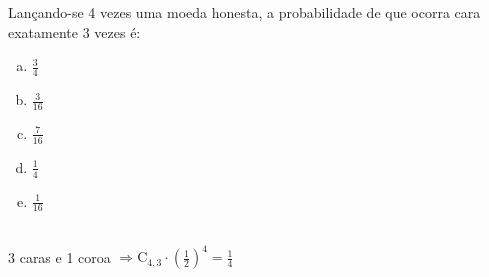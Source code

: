 \begin{ex}
Lançando-se 4 vezes uma moeda honesta, a probabilidade de que ocorra cara exatamente 3 vezes é:
   \begin{enumerate}[(a)]
   \item $\frac{3}{4}$
   \item $\frac{3}{16}$
   \item $\frac{7}{16}$
   \item $\frac{1}{4}$
   \item $\frac{1}{16}$
   \end{enumerate}
    \begin{sol}
     \phantom{A} \\
     3 caras e 1 coroa $\Longrightarrow \mathrm{C}_{4,3}\cdot (\frac{1}{2})^4=\frac{1}{4}$
    \end{sol}
\end{ex}